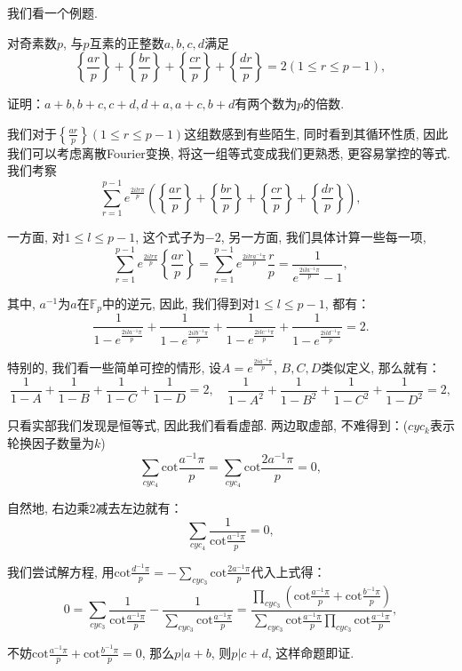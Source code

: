 \documentclass[lang=cn,12pt,thmcnt=section]{elegantbook}
\begin{document}
我们看一个例题.

\begin{example}
对奇素数$p$, 与$p$互素的正整数$a,b,c,d$满足
\[
\left\{\frac{ar}{p}\right\}+\left\{\frac{br}{p}\right\}+\left\{\frac{cr}{p}\right\}+\left\{\frac{dr}{p}\right\}=2(1\le r\le p-1),
\]

证明：$a+b,b+c,c+d,d+a,a+c,b+d$有两个数为$p$的倍数. 
\end{example}

\begin{analysis}
我们对于$\left\{\frac{ar}{p}\right\}(1\le r\le p-1)$这组数感到有些陌生, 同时看到其循环性质, 因此我们可以考虑离散Fourier变换, 将这一组等式变成我们更熟悉, 更容易掌控的等式. 我们考察
\[
\sum_{r=1}^{p-1} e^{\frac{2ilr\pi}{p}}\left(\left\{\frac{ar}{p}\right\}+\left\{\frac{br}{p}\right\}+\left\{\frac{cr}{p}\right\}+\left\{\frac{dr}{p}\right\}\right),
\]

一方面, 对$1\le l\le p-1$, 这个式子为$-2$, 另一方面, 我们具体计算一些每一项, 
\[
\sum_{r=1}^{p-1} e^{\frac{2ilr\pi}{p}}\left\{\frac{ar}{p}\right\}=\sum_{r=1}^{p-1} e^{\frac{2ilra^{-1}\pi}{p}}\frac{r}{p}=\frac{1}{e^{\frac{2ila^{-1}\pi}{p}}-1},
\]

其中, $a^{-1}$为$a$在$\mathbb{F}_p$中的逆元, 因此, 我们得到对$1\le l\le p-1$, 都有：
\[
\frac{1}{1-e^{\frac{2ila^{-1}\pi}{p}}}+\frac{1}{1-e^{\frac{2ilb^{-1}\pi}{p}}}+\frac{1}{1-e^{\frac{2ilc^{-1}\pi}{p}}}+\frac{1}{1-e^{\frac{2ild^{-1}\pi}{p}}}=2.
\]

特别的, 我们看一些简单可控的情形, 设$A=e^{\frac{2ia^{-1}\pi}{p}}$, $B,C,D$类似定义, 那么就有：
\[
\frac{1}{1-A}+\frac{1}{1-B}+\frac{1}{1-C}+\frac{1}{1-D}=2,\quad{}\frac{1}{1-A^2}+\frac{1}{1-B^2}+\frac{1}{1-C^2}+\frac{1}{1-D^2}=2,
\]

只看实部我们发现是恒等式, 因此我们看看虚部. 两边取虚部, 不难得到：($cyc_k$表示轮换因子数量为$k$)
\[
\sum_{cyc_4}\mathrm{cot}\frac{a^{-1}\pi}{p}=\sum_{cyc_4}\mathrm{cot}\frac{2a^{-1}\pi}{p}=0,
\]

自然地, 右边乘$2$减去左边就有：
\[
\sum_{cyc_4}\frac{1}{\mathrm{cot}\frac{a^{-1}\pi}{p}}=0,
\]

我们尝试解方程, 用$\mathrm{cot}\frac{d^{-1}\pi}{p}=-\sum_{cyc_3}\mathrm{cot}\frac{2a^{-1}\pi}{p}$代入上式得：
\[
0=\sum_{cyc_3}\frac{1}{\mathrm{cot}\frac{a^{-1}\pi}{p}}-\frac{1}{\sum_{cyc_3}\mathrm{cot}\frac{a^{-1}\pi}{p}}=\frac{\prod_{cyc_3}(\mathrm{cot}\frac{a^{-1}\pi}{p}+\mathrm{cot}\frac{b^{-1}\pi}{p})}{\sum_{cyc_3}\mathrm{cot}\frac{a^{-1}\pi}{p}\prod_{cyc_3}\mathrm{cot}\frac{a^{-1}\pi}{p}},
\]

不妨$\mathrm{cot}\frac{a^{-1}\pi}{p}+\mathrm{cot}\frac{b^{-1}\pi}{p}=0$, 那么$p|a+b$, 则$p|c+d$, 这样命题即证.
\end{analysis}
\end{document}
